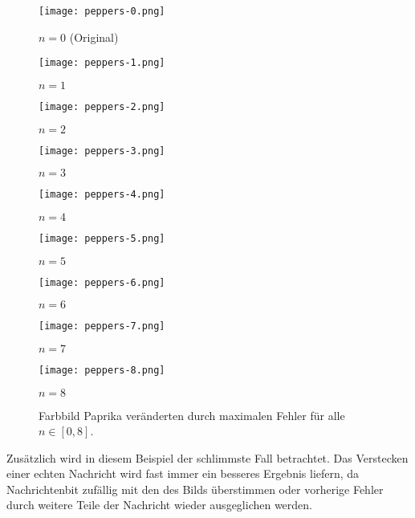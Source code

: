 \begin{figure}[h!]
  \centering
  \begin{minipage}[t]{0.3\textwidth}
    \texttt{[image: peppers-0.png]}
    \caption*{$n = 0$ (Original)}
  \end{minipage}
  \hfill
  \begin{minipage}[t]{0.3\textwidth}
    \texttt{[image: peppers-1.png]}
    \caption*{$n = 1$}
  \end{minipage}
  \hfill
  \begin{minipage}[t]{0.3\textwidth}
    \texttt{[image: peppers-2.png]}
    \caption*{$n = 2$}
  \end{minipage}%
  \vspace{0.5cm}
  \begin{minipage}[t]{0.3\textwidth}
    \texttt{[image: peppers-3.png]}
    \caption*{$n = 3$}
  \end{minipage}
  \hfill
  \begin{minipage}[t]{0.3\textwidth}
    \texttt{[image: peppers-4.png]}
    \caption*{$n = 4$}
  \end{minipage}
  \hfill
  \begin{minipage}[t]{0.3\textwidth}
    \texttt{[image: peppers-5.png]}
    \caption*{$n = 5$}
  \end{minipage}%
  \vspace{0.5cm}
  \begin{minipage}[t]{0.3\textwidth}
    \texttt{[image: peppers-6.png]}
    \caption*{$n = 6$}
  \end{minipage}
  \hfill
  \begin{minipage}[t]{0.3\textwidth}
    \texttt{[image: peppers-7.png]}
    \caption*{$n = 7$}
  \end{minipage}
  \hfill
  \begin{minipage}[t]{0.3\textwidth}
    \texttt{[image: peppers-8.png]}
    \caption*{$n = 8$}
  \end{minipage}
  \caption{Farbbild Paprika veränderten durch maximalen Fehler für alle $n \in [0,8]$.}
  \label{fig:peppers}
\end{figure}
\noindent
Zusätzlich wird in diesem Beispiel der schlimmste Fall betrachtet.
Das Verstecken einer echten Nachricht wird fast immer
ein besseres Ergebnis liefern, da Nachrichtenbit
zufällig mit den des Bilds überstimmen oder vorherige Fehler
durch weitere Teile der Nachricht wieder ausgeglichen werden.

